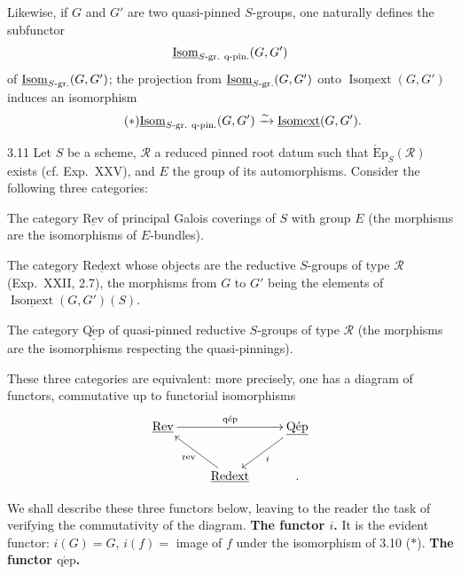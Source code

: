 Likewise, if $G$ and $G'$ are two quasi-pinned $S$-groups, one naturally defines the subfunctor
\[
\underline{\operatorname{Isom}}_{S\text{-gr. q-pin.}}(G,G')
\]
of $\underline{\operatorname{Isom}}_{S\text{-gr.}}(G,G')$; the projection from $\underline{\operatorname{Isom}}_{S\text{-gr.}}(G,G')$ onto $\underline{\operatorname{Isomext}}(G,G')$ induces an isomorphism
\begin{equation}\tag{$*$}
\underline{\operatorname{Isom}}_{S\text{-gr. q-pin.}}(G,G')\xrightarrow{\sim}\underline{\operatorname{Isomext}}(G,G').
\end{equation}
\begin{theorem}{3.11}\label{XXIV.3.11}
Let $S$ be a scheme, $\mathscr R$ a reduced pinned root datum such that $\operatorname{\acute Ep}_S(\mathscr R)$ exists (cf. Exp.~XXV), and $E$ the group of its automorphisms. Consider the following three categories:
\begin{enumeratei}
\item The category $\underline{\mathrm{Rev}}$ of principal Galois coverings of $S$ with group $E$ (the morphisms are the isomorphisms of $E$-bundles).
\item The category $\underline{\mathrm{Redext}}$ whose objects are the reductive $S$-groups of type $\mathscr R$ (Exp.~XXII, 2.7), the morphisms from $G$ to $G'$ being the elements of $\underline{\operatorname{Isomext}}(G,G')(S)$.
\item The category $\underline{\mathrm{Q\acute ep}}$ of quasi-pinned reductive $S$-groups of type $\mathscr R$ (the morphisms are the isomorphisms respecting the quasi-pinnings).
\end{enumeratei}
These three categories are equivalent: more precisely, one has a diagram of functors, commutative up to functorial isomorphisms
\[
\xymatrix{\underline{\mathrm{Rev}}\ar[rr]^{\mathrm{q\acute ep}}&&\underline{\mathrm{Q\acute ep}}\ar[dl]^i\\
&\underline{\mathrm{Redext}}\ar[ul]^{\mathrm{rev}}&.}
\]
\end{theorem}
We shall describe these three functors below, leaving to the reader the task of verifying the commutativity of the diagram.
\label{XXIV.3.11.1}\textbf{The functor $i$.}
It is the evident functor: $i(G)=G$, $i(f)=$ image of $f$ under the isomorphism of 3.10 ($*$).
\label{XXIV.3.11.2}\textbf{The functor $\mathrm{q\acute ep}$.}
